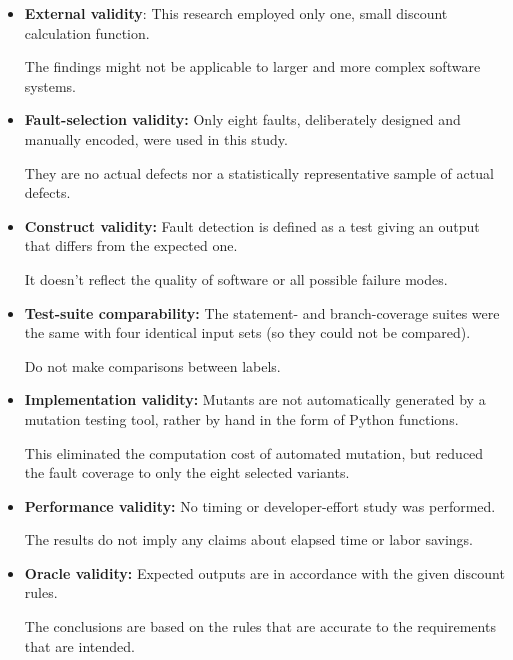 \documentclass[conference]{IEEEtran}
\begin{document}
\begin{itemize}

\item \textbf{External validity}: This research employed only one, small discount calculation function.

The findings might not be applicable to larger and more complex software systems.



\item \textbf{Fault-selection validity:} Only eight faults, deliberately designed and manually encoded, were used in this study.

They are no actual defects nor a statistically representative sample of actual defects.



\item \textbf{Construct validity:} Fault detection is defined as a test giving an output that differs from the expected one.

It doesn't reflect the quality of software or all possible failure modes.


\item \textbf{Test-suite comparability:} The statement- and branch-coverage suites were the same with four identical input sets (so they could not be compared).

Do not make comparisons between labels.


\item \textbf{Implementation validity:} Mutants are not automatically generated by a mutation testing tool, rather by hand in the form of Python functions.

This eliminated the computation cost of automated mutation, but reduced the fault coverage to only the eight selected variants.



\item \textbf{Performance validity:} No timing or developer-effort study was performed.

The results do not imply any claims about elapsed time or labor savings.



\item \textbf{Oracle validity:} Expected outputs are in accordance with the given discount rules.

The conclusions are based on the rules that are accurate to the requirements that are intended.
\end{itemize}
\end{document}
